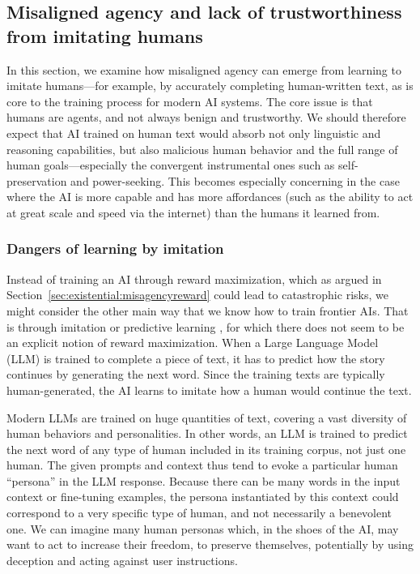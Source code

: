 \subsection{Misaligned agency and lack of trustworthiness from imitating humans}
\label{sec:existential:misagencyimitation}

In this section, we examine how misaligned agency can emerge from learning to imitate humans---for example, by accurately completing human-written text, as is core to the training process for modern AI systems. The core issue is that humans are agents, and not always benign and trustworthy. We should therefore expect that AI trained on human text would absorb not only linguistic and reasoning capabilities, but also malicious human behavior and the full range of human goals---especially the convergent instrumental ones such as self-preservation and power-seeking. This becomes especially concerning in the case where the AI is more capable and has more affordances (such as the ability to act at great scale and speed via the internet) than the humans it learned from.

    \subsubsection{Dangers of learning by imitation}
        \label{sec:existential:misagencyimitation:dangers}

Instead of training an AI through reward maximization, which as argued in Section~\ref{sec:existential:misagencyreward} could lead to catastrophic risks, we might consider the other main way that we know how to train frontier AIs. That is through imitation or predictive learning \cite{dl.acm.org.doi.10.1145.3054912}, for which there does not seem to be an explicit notion of reward maximization. When a Large Language Model (LLM) is trained to complete a piece of text, it has to predict how the story continues by generating the next word. Since the training texts are typically human-generated, the AI learns to imitate how a human would continue the text.

Modern LLMs are trained on huge quantities of text, covering a vast diversity of human behaviors and personalities. In other words, an LLM is trained to predict the next word of any type of human included in its training corpus, not just one human. The given prompts and context thus tend to evoke a particular human ``persona'' in the LLM response. Because there can be many words in the input context or fine-tuning examples, the persona instantiated by this context could correspond to a very specific type of human, and not necessarily a benevolent one. We can imagine many human personas which, in the shoes of the AI, may want to act to increase their freedom, to preserve themselves, potentially by using deception and acting against user instructions.

